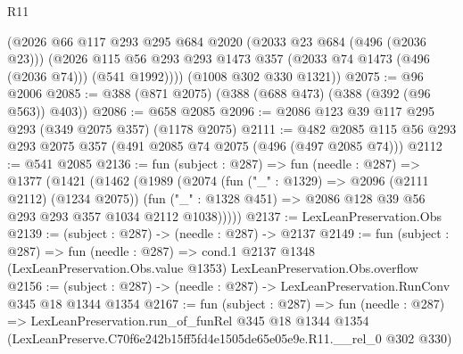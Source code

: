 \begin{lexlean}{R11}
\begin{coremodule}
        (@2026
          @66
          @117
          @293
          @295
          @684
          @2020
          (@2033 @23 @684 (@496 (@2036 @23)))
          (@2026 @115 @56 @293 @293 @1473 @357 (@2033 @74 @1473 (@496 (@2036 @74))) (@541 @1992))))
      (@1008 @302 @330 @1321))
@2075 := @96 @2006
@2085 := @388 (@871 @2075) (@388 (@688 @473) (@388 (@392 (@96 @563)) @403))
@2086 := @658 @2085
@2096 := @2086 @123 @39 @117 @295 @293 (@349 @2075 @357) (@1178 @2075)
@2111 := @482 @2085 @115 @56 @293 @293 @2075 @357 (@491 @2085 @74 @2075 (@496 (@497 @2085 @74)))
@2112 := @541 @2085
@2136 := fun (subject : @287) =>
  fun (needle : @287) =>
  @1377
    (@1421
      (@1462
        (@1989
          (@2074
            (fun ("_" : @1329) => @2096 (@2111 @2112) (@1234 @2075))
            (fun ("_" : @1328 @451) => @2086 @128 @39 @56 @293 @293 @357 @1034 @2112 @1038)))))
@2137 := LexLeanPreservation.Obs
@2139 := (subject : @287) -> (needle : @287) -> @2137
@2149 := fun (subject : @287) =>
  fun (needle : @287) =>
  cond.{1} @2137 @1348 (LexLeanPreservation.Obs.value @1353) LexLeanPreservation.Obs.overflow
@2156 := (subject : @287) -> (needle : @287) -> LexLeanPreservation.RunConv @345 @18 @1344 @1354
@2167 := fun (subject : @287) =>
  fun (needle : @287) =>
  LexLeanPreservation.run_of_funRel
    @345
    @18
    @1344
    @1354
    (LexLeanPreserve.C70f6e242b15ff5fd4e1505de65e05e9e.R11.__rel_0 @302 @330)
\end{coremodule}
\end{lexlean}

